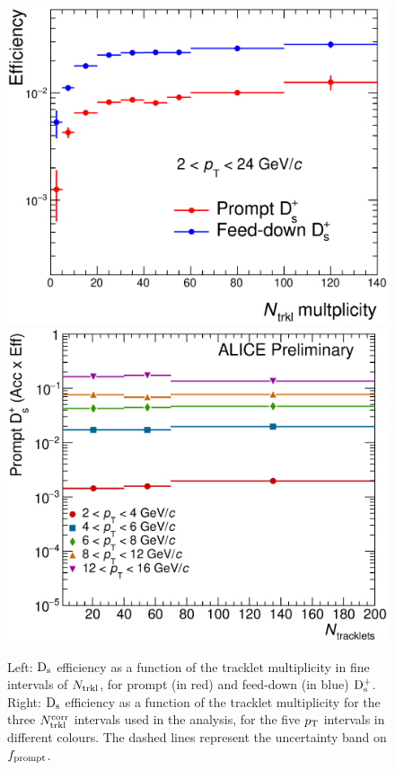 \begin{figure}[!h]
\centering
 \includegraphics[width=.49\textwidth]{FigCap6/EffDsfineNtrklBins_Uncorr.eps}
 \includegraphics[width=.49\textwidth]{FigCap6/PromptDsEfficiency_times_Acceptance_VsNtrkl.eps}
 \caption{Left: ${\rm D_s}$ efficiency as a function of the tracklet multiplicity in fine intervals of $N_{\rm trkl}$, for prompt (in red) and feed-down (in blue) ${\rm D_s^+}$. Right: ${\rm D_s}$ efficiency as a function of the tracklet multiplicity for the three $N_{\rm trkl}^{\rm corr}$ intervals used in the analysis, for the five $p_{\rm T}$ intervals in different colours. The dashed lines represent the uncertainty band on $f_{\rm prompt}$.}
 \label{fig:DsEffVsMult}
\end{figure}



